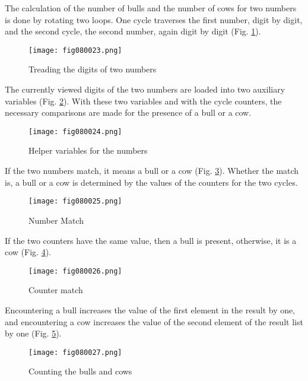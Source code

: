 The calculation of the number of bulls and the number of cows for two numbers is done by rotating two loops. One cycle traverses the first number, digit by digit, and the second cycle, the second number, again digit by digit (Fig. \ref{fig080023}).

\begin{figure}[H]
   \centering
   \texttt{[image: fig080023.png]}
   \caption{Treading the digits of two numbers}
\label{fig080023}
\end{figure}

The currently viewed digits of the two numbers are loaded into two auxiliary variables (Fig. \ref{fig080024}). With these two variables and with the cycle counters, the necessary comparisons are made for the presence of a bull or a cow.

\begin{figure}[H]
   \centering
   \texttt{[image: fig080024.png]}
   \caption{Helper variables for the numbers}
\label{fig080024}
\end{figure}

If the two numbers match, it means a bull or a cow (Fig. \ref{fig080025}). Whether the match is, a bull or a cow is determined by the values of the counters for the two cycles.

\begin{figure}[H]
   \centering
   \texttt{[image: fig080025.png]}
   \caption{Number Match}
\label{fig080025}
\end{figure}

If the two counters have the same value, then a bull is present, otherwise, it is a cow (Fig. \ref{fig080026}).

\begin{figure}[H]
   \centering
   \texttt{[image: fig080026.png]}
   \caption{Counter match}
\label{fig080026}
\end{figure}

Encountering a bull increases the value of the first element in the result by one, and encountering a cow increases the value of the second element of the result list by one (Fig. \ref{fig080027}).

\begin{figure}[H]
   \centering
   \texttt{[image: fig080027.png]}
   \caption{Counting the bulls and cows}
\label{fig080027}
\end{figure}

